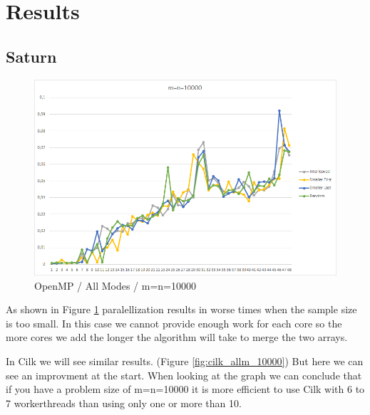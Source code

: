 \documentclass[12pt,a4paper,titlepage,oneside]{scrartcl}
\begin{document}
\section{Results}

\subsection{Saturn}

\begin{figure}[h]
\includegraphics[width=\linewidth]{Saturn_OpenMP_10000}
\caption{OpenMP / All Modes / m=n=10000}
\label{fig:omp_allm_10000}
\end{figure}

As shown in Figure \ref{fig:omp_allm_10000} paralellization results in worse times when the sample size is too small. In this case we cannot provide enough work for each core so the more cores we add the longer the algorithm will take to merge the two arrays.

In Cilk we will see similar results. (Figure \ref{fig:cilk_allm_10000}) But here we can see an improvment at the start. When looking at the graph we can conclude that if you have a problem size of m=n=10000 it is more efficient to use Cilk with 6 to 7 workerthreads than using only one or more than 10.
\end{document}
